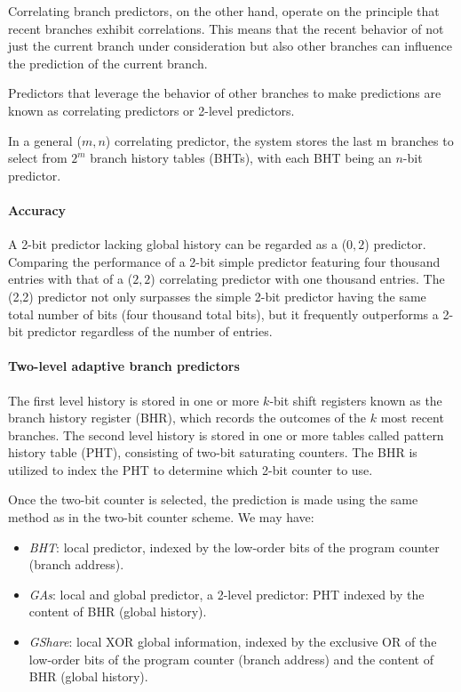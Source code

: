 Correlating branch predictors, on the other hand, operate on the principle that recent branches exhibit correlations. 
This means that the recent behavior of not just the current branch under consideration but also other branches can influence the prediction of the current branch.

Predictors that leverage the behavior of other branches to make predictions are known as correlating predictors or 2-level predictors.

In a general ($m, n$) correlating predictor, the system stores the last m branches to select from $2^m$ branch history tables (BHTs), with each BHT being an $n$-bit predictor.

\paragraph*{Accuracy}
A 2-bit predictor lacking global history can be regarded as a ($0, 2$) predictor.
Comparing the performance of a 2-bit simple predictor featuring four thousand entries with that of a ($2,2$) correlating predictor with one thousand entries.
The (2,2) predictor not only surpasses the simple 2-bit predictor having the same total number of bits (four thousand total bits), but it frequently outperforms a 2-bit predictor regardless of the number of entries.

\paragraph*{Two-level adaptive branch predictors}
The first level history is stored in one or more $k$-bit shift registers known as the branch history register (BHR), which records the outcomes of the $k$ most recent branches.
The second level history is stored in one or more tables called pattern history table (PHT), consisting of two-bit saturating counters.
The BHR is utilized to index the PHT to determine which 2-bit counter to use.

Once the two-bit counter is selected, the prediction is made using the same method as in the two-bit counter scheme.
We may have: 
\begin{itemize}
    \item \textit{BHT}: local predictor, indexed by the low-order bits of the program counter (branch address).
    \item \textit{GAs}: local and global predictor, a 2-level predictor: PHT indexed by the content of BHR (global history).
    \item \textit{GShare}: local XOR global information, indexed by the exclusive OR of the low-order bits of the program counter (branch address) and the content of BHR (global history).
\end{itemize}
